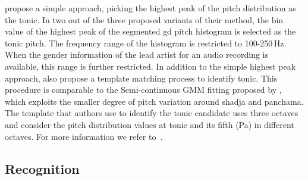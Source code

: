 {\cite{Ashwin_Istanbul2012} propose a simple approach, picking the highest peak of the pitch distribution as the tonic. In two out of the three proposed variants of their method, the bin value of the highest peak of the segmented \gls{gd} pitch histogram is selected as the tonic pitch. The frequency range of the histogram is restricted to 100-250\,Hz. When the gender information of the lead artist for an audio recording is available, this range is further restricted. In addition to the simple highest peak approach, \cite{Ashwin_Istanbul2012} also propose a template matching process to identify tonic. This procedure is comparable to the Semi-continuous GMM fitting proposed by \cite{Ranjani2011}, which exploits the smaller degree of pitch variation around \gls{shadja} and panchama. The template that authors use to identify the tonic candidate uses three octaves and consider the pitch distribution values at tonic and its fifth (Pa) in different octaves. For more information we refer to~\cite{Gulati2014Tonic}.




\subsection{ Recognition}
\label{sec:sota_raga_recognition}


}
